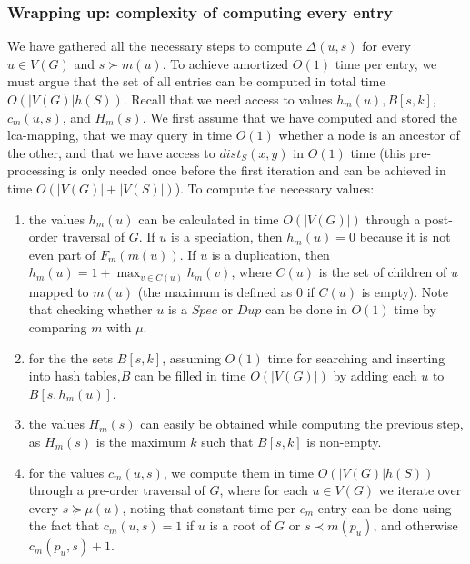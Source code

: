 \documentclass[10pt]{article}
\begin{document}
\subsubsection{Wrapping up: complexity of computing every entry}

We have gathered all the necessary steps to compute $\Delta(u, s)$ for every $u \in V(G)$ and $s \succ m(u)$.  To achieve amortized $O(1)$ time per entry, we must argue that the set of all entries can be computed in total time $O(|V(G)|h(S))$.
Recall that we need access to values $h_m(u), B[s, k]$, $c_m(u, s)$, and $H_m(s)$.  We first assume that we have computed and stored the lca-mapping, that we may query in time $O(1)$ whether a node is an ancestor of the other, and that we have access to $dist_S(x, y)$ in $O(1)$ time (this pre-processing is only needed once before the first iteration and can be achieved in time $O(|V(G)| + |V(S)|)$).
To compute the necessary values:

\begin{enumerate}
    
    \item 
    the values $h_m(u)$ can be calculated in time $O(|V(G)|)$ through a post-order traversal of $G$.  If $u$ is a speciation, then $h_m(u) = 0$ because it is not even part of $F_m(m(u))$.  If $u$ is a duplication, then $h_m(u) = 1 + \max_{v \in C(u)} h_m(v)$, where $C(u)$ is the set of children of $u$ mapped to $m(u)$ (the maximum is defined as $0$ if $C(u)$ is empty).  Note that checking whether $u$ is a $Spec$ or $Dup$ can be done in $O(1)$ time by comparing $m$ with $\mu$.

    
    \item 
    for the the sets $B[s, k]$, assuming $O(1)$ time for searching and inserting into hash tables,$B$ can be filled in time $O(|V(G)|)$ by adding each $u$ to $B[s, h_m(u)]$.

    \item 
    the values $H_m(s)$ can easily be obtained while computing the previous step, as $H_m(s)$ is the maximum $k$ such that $B[s, k]$ is non-empty.

    \item 
    for the values $c_m(u, s)$, we compute them in time $O(|V(G)| h(S))$ through a pre-order traversal of $G$, where for each $u \in V(G)$ we iterate over every $s \succeq \mu(u)$, noting that constant time per $c_m$ entry can be done using the fact that $c_m(u, s) =
    1$ if $u$ is a root of $G$ or $s \prec m(p_u)$, and otherwise $c_m(p_u, s) + 1$.
\end{enumerate}
\end{document}
